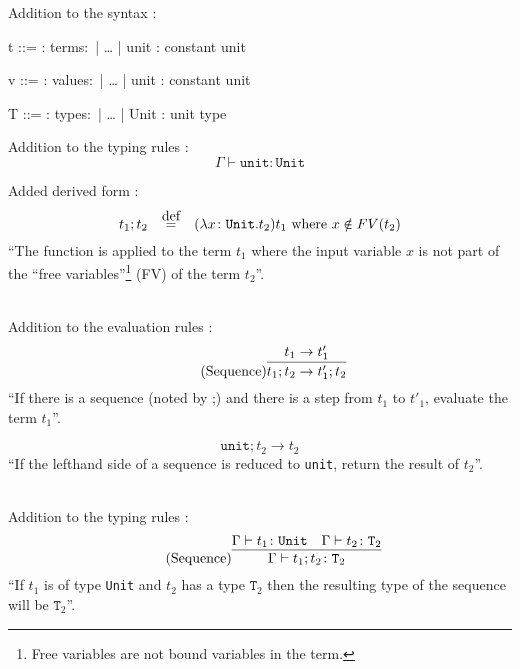 Addition to the syntax \cite{pierce2002ProgLang}:

\begin{bnfgrammar}
    t ::= : terms$\colon$
    | \dots
    | unit : constant unit
\end{bnfgrammar}\leavevmode\newline

\begin{bnfgrammar}
    v ::= : values$\colon$
    | \dots
    | unit : constant unit
\end{bnfgrammar}\leavevmode\newline

\begin{bnfgrammar}
    T ::= : types$\colon$
    | \dots
    | Unit : unit type
\end{bnfgrammar}\leavevmode\newline

Addition to the typing rules \cite{pierce2002ProgLang}:
\begin{equation*}
    \tag{Unit}
    \Gamma \vdash \texttt{unit} \colon \texttt{Unit}
\end{equation*}\leavevmode\newline

Added derived form \cite{pierce2002ProgLang}:
\begin{equation*}
    t_1 ; t_2 \quad \defeq \quad (\lambda x \colon \texttt{Unit} . t_2) t_1 \text{ where } x \notin FV(t_2)
\end{equation*}
``The function is applied to the term $t_1$ where the input variable $x$ is not
part of the ``free variables''\footnote{Free variables are not bound variables in the term.}
(FV) of the term $t_2$''.

~\\
Addition to the evaluation rules \cite{pierce2002ProgLang}:
\begin{equation*}
    \tag{Sequence}
    \infer{
        t_1 ; t_2 \rightarrow t'_1 ; t_2
    }{
        t_1 \rightarrow t'_1
    }
\end{equation*}
``If there is a sequence (noted by ;) and there is a step from $t_1$ to
$t'_1$, evaluate the term $t_1$''.

\begin{equation*}
    \tag{Sequence Next}
    \texttt{unit} ; t_2 \rightarrow t_2
\end{equation*}
``If the lefthand side of a sequence is reduced to \texttt{unit},
return the result of $t_2$''.

~\\
Addition to the typing rules \cite{pierce2002ProgLang}:
\begin{equation*}
    \tag{Sequence}
    \infer{
        \Gamma \vdash t_1 ; t_2 \colon \texttt{T}_2
    }{
        \Gamma \vdash t_1 \colon \texttt{Unit} & \Gamma \vdash t_2 \colon \texttt{T}_2
    }
\end{equation*}
``If $t_1$ is of type \texttt{Unit} and $t_2$ has a type $\texttt{T}_2$ then
the resulting type of the sequence will be $\texttt{T}_2$''.

